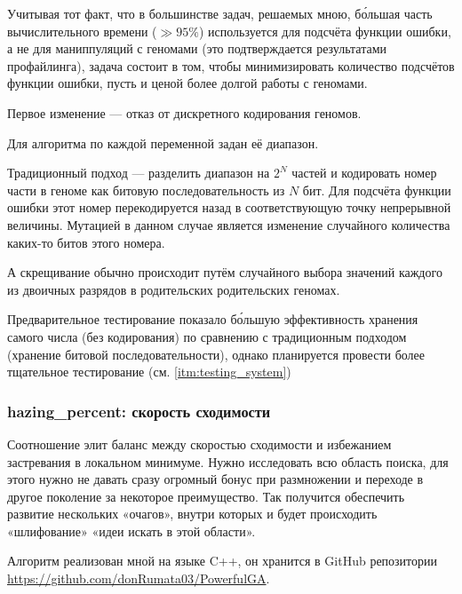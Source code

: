Учитывая тот факт, что в большинстве задач, решаемых мною, бо́льшая часть вычислительного времени ($\gg 95\%$) используется для подсчёта функции ошибки, а не для маниппуляций с геномами
(это подтверждается результатами профайлинга),
задача состоит в том, чтобы минимизировать количество подсчётов функции ошибки, пусть и ценой более долгой работы с геномами.

Первое изменение — отказ от дискретного кодирования геномов.

Для алгоритма по каждой переменной задан её диапазон.

Традиционный подход — разделить диапазон на $2^N$ частей и кодировать номер части в геноме как битовую последовательность из $N$ бит.
Для подсчёта функции ошибки этот номер перекодируется назад в соответствующую точку непрерывной величины.
Мутацией в данном случае является изменение случайного количества каких-то битов этого номера.

А скрещивание обычно происходит путём случайного выбора значений каждого из двоичных разрядов в родительских
родительских геномах.

Предварительное тестирование показало бо́льшую эффективность хранения самого числа (без кодирования) по сравнению с традиционным подходом (хранение битовой последовательности), однако планируется провести более тщательное тестирование (см. \ref{itm:testing_system})

\subsubsection{hazing\_percent: скорость сходимости}\label{subsubsec:hazing}
Соотношение элит
баланс между скоростью сходимости и избежанием застревания в локальном минимуме.
Нужно исследовать всю область поиска, для этого нужно не давать сразу огромный бонус при размножении и переходе в другое поколение за некоторое преимущество.
Так получится обеспечить развитие нескольких «очагов», внутри которых и будет происходить «шлифование» «идеи искать в этой области».

Алгоритм реализован мной на языке C++, он хранится в GitHub репозитории \href{https://github.com/donRumata03/PowerfulGA}{https://github.com/donRumata03/PowerfulGA}.